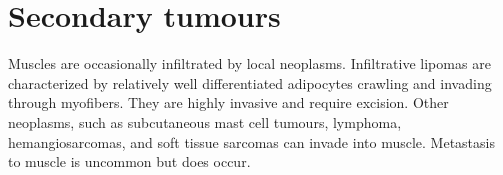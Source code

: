 \documentclass[openany]{book}
\begin{document}
\section{Secondary tumours}\label{secondary-tumours}

Muscles are occasionally infiltrated by local neoplasms. Infiltrative
lipomas are characterized by relatively well differentiated adipocytes
crawling and invading through myofibers. They are highly invasive and
require excision. Other neoplasms, such as subcutaneous mast cell
tumours, lymphoma, hemangiosarcomas, and soft tissue sarcomas can invade
into muscle. Metastasis to muscle is uncommon but does occur.


\end{document}
